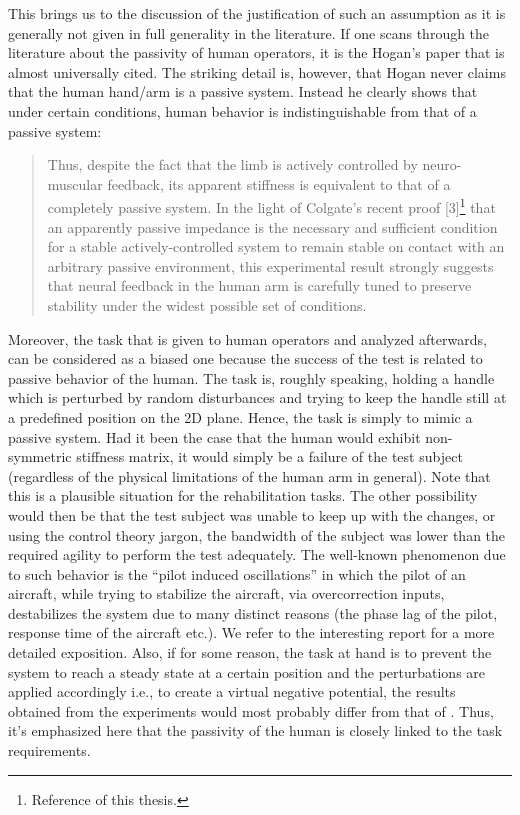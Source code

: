 This brings us to the discussion of the justification of such an assumption as it is generally not given in full generality in the
literature. If one scans through the literature about the passivity of human operators, it is the Hogan's paper \cite{hogan89}
that is almost universally cited. The striking detail is, however, that Hogan never claims that the human hand/arm is a passive
system. Instead he clearly shows that under certain conditions, human behavior is indistinguishable from that of a 
passive system: 
\begin{quote}
Thus, despite the fact that the
limb is actively controlled by neuro-muscular feedback, its apparent
stiffness is equivalent to that of a completely passive
system. In the light of Colgate's recent proof [3]\footnote{Reference 
\cite{colgatehogan88} of this thesis.} that an
apparently passive impedance is the necessary and sufficient
condition for a stable actively-controlled system to remain stable
on contact with an arbitrary passive environment, this
experimental result strongly suggests that neural feedback in the
human arm is carefully tuned to preserve stability under the
widest possible set of conditions.
\end{quote}
Moreover, the task that is given to human operators and analyzed afterwards, can be considered as a biased one because the success 
of the test is related to passive behavior of the human. The task is, roughly speaking, holding a handle which is perturbed by random disturbances and 
trying to keep the handle still at a predefined position on the 2D plane. Hence, the task is simply to mimic a passive 
system. Had it been the case that the human would exhibit non-symmetric stiffness matrix, it would simply be a failure of the 
test subject (regardless of the physical limitations of the human arm in general). Note that this 
is a plausible situation for the rehabilitation tasks. The other possibility would then be that the test subject was unable to keep up 
with the changes, or using the control theory jargon, the bandwidth of the subject was lower than the required agility to 
perform the test adequately.  The well-known phenomenon due to such behavior is the \enquote{pilot induced oscillations} in which the pilot
of an aircraft, while trying to stabilize the aircraft, via overcorrection inputs, destabilizes the system due to many distinct reasons 
(the phase lag of the pilot, response time of the aircraft etc.). We refer to the interesting 
report \cite{mcruer} for a more detailed exposition. Also, if for some reason, the task at hand is to prevent the system 
to reach a steady state at a certain position and the perturbations are applied accordingly i.e., to create a virtual negative potential, 
the results obtained from the experiments would most probably differ from that of \cite{mussa85}. Thus, it's emphasized here 
that the passivity of the human is closely linked to the task requirements. 


